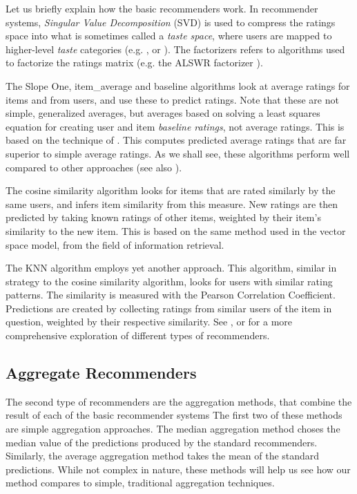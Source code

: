 Let us briefly explain how the basic recommenders work.
In recommender systems, \emph{Singular Value Decomposition} (SVD) is used to compress 
the ratings space into what is sometimes called a \emph{taste space},
where users are mapped to higher-level \emph{taste} categories
(e.g. \cite[p.5]{Ahn2004}, \cite[p.4]{Brand2003} or \cite[p.2]{Liu2006}).
The factorizers refers to algorithms used to factorize the ratings matrix
(e.g. the ALSWR factorizer \cite{Zhou2008}).

The Slope One, item\_average and baseline algorithms look at average
ratings for items and from users, and use these to predict ratings.
Note that these are not simple, generalized averages, but averages
based on solving a least squares equation for creating user and item
\emph{baseline ratings}, not average ratings.
This is based on the technique of \cite[p.2]{Koren2008}.
This computes predicted average ratings that are far superior
to simple average ratings. 
As we shall see, these algorithms perform well compared
to other approaches (see also \cite[p.15]{Bjorkoy2011}). 

The cosine similarity algorithm looks for items that are rated
similarly by the same users, and infers item similarity from this measure.
New ratings are then predicted by taking known ratings of other items,
weighted by their item's similarity to the new item.
This is based on the same method used in the vector space model,
from the field of information retrieval.

The KNN algorithm employs yet another approach. This algorithm,
similar in strategy to the cosine similarity algorithm,
looks for users with similar rating patterns.
The similarity is measured with the Pearson Correlation Coefficient.
Predictions are created by collecting ratings from similar users
of the item in question, weighted by their respective similarity.
See \cite{Adomavicius2005}, \cite{Pazzani2007} or \cite{Schafer2007}
for a more comprehensive exploration of different types of recommenders.


\subsection{Aggregate Recommenders}

The second type of recommenders are the aggregation methods, 
that combine the result of each of the basic recommender systems
The first two of these methods are simple aggregation approaches.
The median aggregation method choses the median value of the predictions
produced by the standard recommenders.
Similarly, the average aggregation method takes the mean of the
standard predictions.
While not complex in nature, these methods
will help us see how our method compares to simple, traditional
aggregation techniques.

